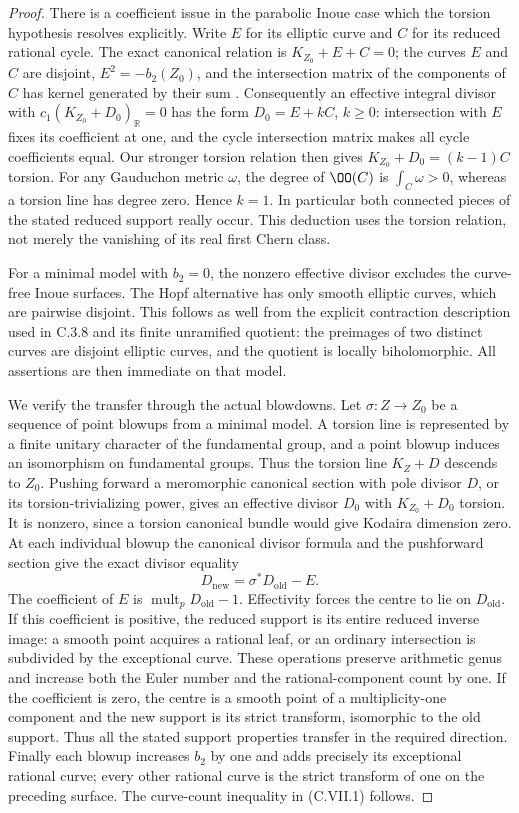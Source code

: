 \begin{proof}
There is a coefficient issue in the parabolic Inoue case
which the torsion hypothesis resolves explicitly. Write
$E$ for its elliptic curve and $C$ for its reduced rational
cycle. The exact canonical relation is
$K_{Z_0}+E+C=0$; the curves $E$ and $C$ are disjoint,
$E^2=-b_2(Z_0)$, and the intersection matrix of the
components of $C$ has kernel generated by their sum
\cite[Lemma~2.22 and the following paragraph; Proposition~2.27]{Dloussky2006}.
Consequently an effective integral divisor with
$c_1(K_{Z_0}+D_0)_{\mathbb R}=0$ has the form
$D_0=E+kC$, $k\ge0$: intersection with $E$ fixes its
coefficient at one, and the cycle intersection matrix
makes all cycle coefficients equal. Our stronger
torsion relation then gives
$K_{Z_0}+D_0=(k-1)C$ torsion. For any Gauduchon metric
$\omega$, the degree of $\OO(C)$ is
$\int_C\omega>0$, whereas a torsion line has degree
zero. Hence $k=1$. In particular both connected
pieces of the stated reduced support really occur.
This deduction uses the torsion relation, not merely
the vanishing of its real first Chern class.

For a minimal model with $b_2=0$, the nonzero effective
divisor excludes the curve-free Inoue surfaces. The
Hopf alternative has only smooth elliptic curves, which
are pairwise disjoint. This follows as well from the
explicit contraction description used in C.3.8 and its
finite unramified quotient: the preimages of two distinct
curves are disjoint elliptic curves, and the quotient
is locally biholomorphic. All assertions are then
immediate on that model.

We verify the transfer through the actual blowdowns.
Let $\sigma:Z\to Z_0$ be a sequence of point blowups
from a minimal model. A torsion line is represented by
a finite unitary character of the fundamental group,
and a point blowup induces an isomorphism on fundamental
groups. Thus the torsion line $K_Z+D$ descends to $Z_0$.
Pushing forward a meromorphic canonical section with pole
divisor $D$, or its torsion-trivializing power, gives an
effective divisor $D_0$ with $K_{Z_0}+D_0$ torsion.
It is nonzero, since a torsion canonical bundle would
give Kodaira dimension zero. At each individual blowup
the canonical divisor formula and the pushforward section
give the exact divisor equality
\[
 D_{\mathrm{new}}=\sigma^*D_{\mathrm{old}}-E.
\tag{C.VII.2}
\]
The coefficient of $E$ is
$\operatorname{mult}_pD_{\mathrm{old}}-1$.
Effectivity forces the centre to lie on $D_{\mathrm{old}}$.
If this coefficient is positive, the reduced support
is its entire reduced inverse image: a smooth point
acquires a rational leaf, or an ordinary intersection
is subdivided by the exceptional curve. These operations
preserve arithmetic genus and increase both the Euler
number and the rational-component count by one.
If the coefficient is zero, the centre is a smooth point
of a multiplicity-one component and the new support is
its strict transform, isomorphic to the old support.
Thus all the stated support properties transfer in the
required direction. Finally each blowup increases $b_2$
by one and adds precisely its exceptional rational
curve; every other rational curve is the strict transform
of one on the preceding surface. The curve-count
inequality in (C.VII.1) follows.
\end{proof}



